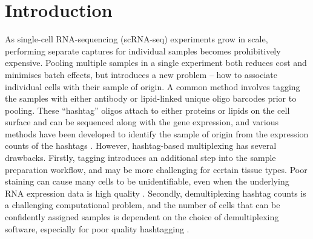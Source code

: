 \documentclass[unnumsec,webpdf,modern,large]{oup-authoring-template}
\begin{document}
	
		\maketitle
	
		\section{Introduction}
	\label{sec:introduction}
	
	As single-cell RNA-sequencing (scRNA-seq) experiments grow in scale, performing separate captures for individual samples becomes prohibitively expensive. 
	Pooling multiple samples in a single experiment both reduces cost and minimises batch effects, but introduces a new problem – how to associate individual cells with their sample of origin. 
	A common method involves tagging the samples with either antibody or lipid-linked unique oligo barcodes prior to pooling. 
	These ``hashtag'' oligos attach to either proteins
	\citep{Stoeckius2018} 
	or lipids \citep{McGinnis2019}
	on the cell surface and can be sequenced along with the gene expression, and various methods have been developed to identify the sample of origin from the expression counts of the hashtags 
	\citep{Howitt2023}.
	However, hashtag-based multiplexing has several drawbacks. 
	Firstly, tagging introduces an additional step into the sample preparation workflow, and may be more challenging for certain tissue types. 
	Poor staining can cause many cells to be unidentifiable, even when the underlying RNA expression data is high quality 
	\citep{Brown2024}. 
	Secondly, demultiplexing hashtag counts is a challenging computational problem, and the number of cells that can be confidently assigned samples is dependent on the choice of demultiplexing software, especially for poor quality hashtagging 
	\citep{Howitt2023}.
	
\end{document}
